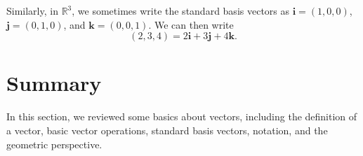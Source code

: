 \documentclass{ximera}
\begin{document}
Similarly, in $\mathbb{R}^3$, we sometimes write the standard basis vectors as $\mathbf{i} = (1,0,0)$, $\mathbf{j} = (0,1,0)$, and $\mathbf{k} = (0,0,1)$. We can then write
\[
(2,3,4) = 2\mathbf{i}+3\mathbf{j}+4\mathbf{k}.
\]

\section{Summary}

In this section, we reviewed some basics about vectors, including the definition of a vector, basic vector operations, standard basis vectors, notation, and the geometric perspective.
\end{document}
